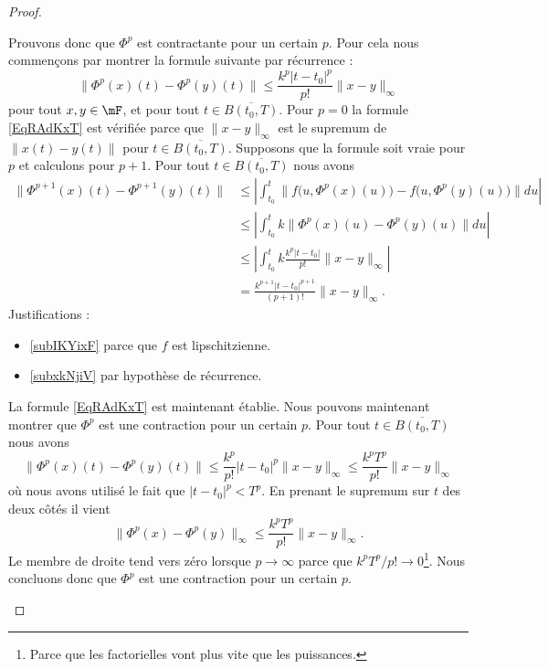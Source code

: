 \begin{proof}
\begin{subproof}
		Prouvons donc que \( \Phi^p\) est contractante pour un certain \( p\). Pour cela nous commençons par montrer la formule suivante par récurrence :
		\begin{equation}        \label{EqRAdKxT}
			\big\| \Phi^p(x)(t)-\Phi^p(y)(t) \big\|\leq \frac{ k^p| t-t_0 |^p }{ p! }\| x-y \|_{\infty}
		\end{equation}
		pour tout \( x,y\in\mF\), et pour tout \( t\in\overline{ B(t_0,T) }\). Pour \( p=0\) la formule \eqref{EqRAdKxT} est vérifiée parce que \( \| x-y \|_{\infty}\) est le supremum de \( \| x(t)-y(t) \|\) pour \( t\in\overline{ B(t_0,T) }\). Supposons que la formule soit vraie pour \( p\) et calculons pour \( p+1\). Pour tout \( t\in\overline{ B(t_0,T) }\) nous avons
		\begin{subequations}
			\begin{align}
				\big\| \Phi^{p+1}(x)(t)-\Phi^{p+1}(y)(t) \big\| & \leq \left| \int_{t_0}^t\big\| f\big( u,\Phi^p(x)(u) \big)-f\big( u,\Phi^p(y)(u) \big) \big\|du \right|                     \\
				                                                & \leq \left| \int_{t_0}^tk\| \Phi^p(x)(u)-\Phi^p(y)(u) \|du \right|                  \label{subIKYixF}                       \\
				                                                & \leq \left| \int_{t_0}^tk\frac{ k^p| t-t_0 | }{ p! }\| x-y \|_{\infty} \right|                          & \label{subxkNjiV} \\
				                                                & = \frac{ k^{p+1}| t-t_0 |^{p+1} }{ (p+1)! }\| x-y \|_{\infty}.
			\end{align}
		\end{subequations}
		Justifications :
		\begin{itemize}
			\item \eqref{subIKYixF} parce que \( f\) est lipschitzienne.
			\item \eqref{subxkNjiV} par hypothèse de récurrence.
		\end{itemize}
		La formule \eqref{EqRAdKxT} est maintenant établie. Nous pouvons maintenant montrer que \( \Phi^p\) est une contraction pour un certain \( p\). Pour tout \( t\in \overline{ B(t_0,T) }\) nous avons
		\begin{equation}
			\| \Phi^p(x)(t)-\Phi^p(y)(t) \|\leq \frac{ k^p }{ p! }| t-t_0 |^p\| x-y \|_{\infty}     \leq \frac{ k^pT^p }{ p! }\| x-y \|_{\infty}
		\end{equation}
		où nous avons utilisé le fait que \( | t-t_0 |^p<T^p\). En prenant le supremum sur \( t\) des deux côtés il vient
		\begin{equation}
			\| \Phi^p(x)-\Phi^p(y) \|_{\infty}\leq\frac{ k^pT^p }{ p! }\| x-y \|_{\infty}.
		\end{equation}
		Le membre de droite tend vers zéro lorsque \( p\to\infty\) parce que \( k^pT^p/p!\to 0\)\footnote{Parce que les factorielles vont plus vite que les puissances.}. Nous concluons donc que \( \Phi^p\) est une contraction pour un certain \( p\).


\end{subproof}
\end{proof}
